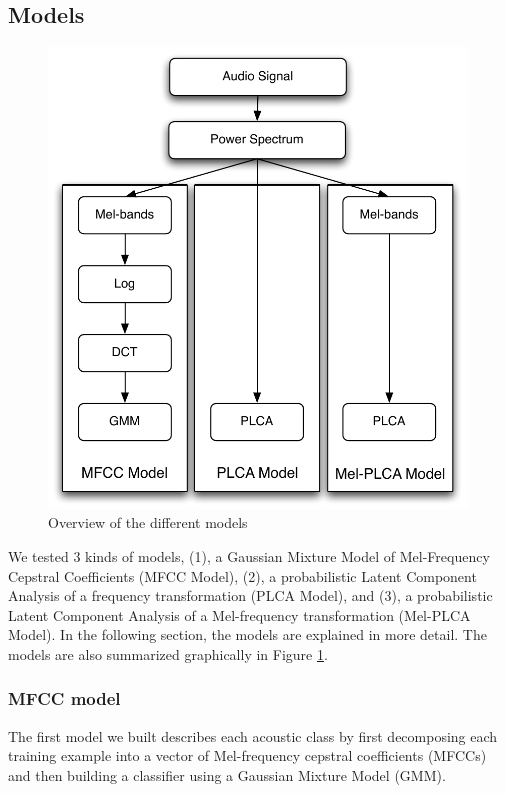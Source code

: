 \documentclass[a4paper,10pt,final]{ThesisStyle}
\begin{document}
\subsection{Models}

\begin{figure}
\centering
\includegraphics[width=0.99\textwidth]{images/models.pdf}
\caption{Overview of the different models}
\label{fig:models}
\end{figure}


We tested 3 kinds of models, (1), a Gaussian Mixture Model of Mel-Frequency Cepstral Coefficients (MFCC Model), (2), a probabilistic Latent Component Analysis of a frequency transformation (PLCA Model), and (3), a probabilistic Latent Component Analysis of a Mel-frequency transformation (Mel-PLCA Model).  In the following section, the models are explained in more detail.  The models are also summarized graphically in Figure \ref{fig:models}.

\subsubsection{MFCC model}
The first model we built describes each acoustic class by first decomposing each training example into a vector of Mel-frequency cepstral coefficients (MFCCs) and then building a classifier using a Gaussian Mixture Model (GMM).  
\end{document}
